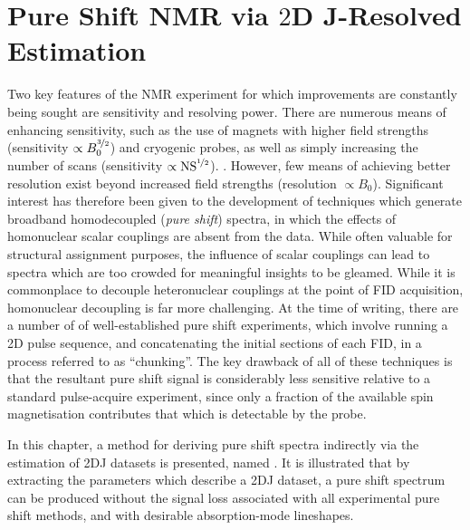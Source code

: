 \chapter{Pure Shift NMR via $2$D J-Resolved Estimation}
\label{chap:cupid}
Two key features of the \ac{NMR} experiment for which improvements are
constantly being sought are sensitivity and resolving power. There are numerous
means of enhancing sensitivity, such as the use of magnets with higher field
strengths\cite{Maeda2019} (sensitivity $\propto B_0^{\nicefrac{3}{2}}$) and
cryogenic probes\cite{Kovacs2020}, as well as simply
increasing the number of scans (sensitivity $\propto
\operatorname{NS}^{\nicefrac{1}{2}}$).
.
However, few means of achieving better resolution exist beyond increased field
strengths (resolution $\propto B_0$). Significant interest has therefore been
given to the development of techniques which generate broadband homodecoupled
(\emph{pure shift}) spectra, in which the effects of homonuclear scalar
couplings are absent from the data. While often valuable for structural
assignment purposes, the influence of scalar couplings can lead to spectra
which are too crowded for meaningful insights to be gleamed. While it is
commonplace to decouple heteronuclear couplings at the point of \ac{FID}
acquisition\cite{Shaka1983a, Shaka1983b,Shaka1985}, homonuclear decoupling is
far more challenging. At the time of writing, there are a number of of
well-established pure shift experiments, which involve running a \ac{2D} pulse
sequence, and concatenating the initial sections of each \ac{FID}, in a process
referred to as ``chunking''\cite{Meyer2013,Adams2014,Zangger2015}. The key
drawback of all of these techniques is that the resultant pure shift signal is
considerably less sensitive relative to a standard pulse-acquire experiment,
since only a fraction of the available spin magnetisation contributes that
which is detectable by the probe.

In this chapter, a method for deriving pure shift spectra indirectly via the
estimation of \ac{2DJ} datasets is presented, named . It is
illustrated that by extracting the
parameters which describe a \ac{2DJ} dataset, a pure shift spectrum can be
produced without the signal loss associated with all experimental pure shift
methods, and with desirable absorption-mode lineshapes.





